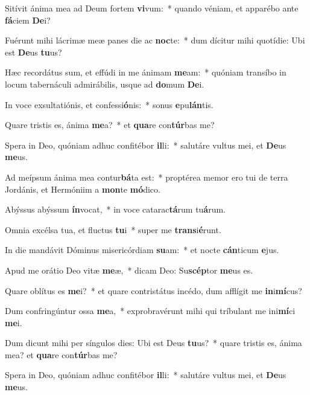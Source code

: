 \item Sitívit ánima mea ad Deum fortem \textbf{vi}vum:~* quando véniam, et apparébo ante \textbf{fá}ciem \textbf{De}i?
\item Fuérunt mihi lácrimæ meæ panes die ac \textbf{noc}te:~* dum dícitur mihi quotídie: Ubi est \textbf{De}us \textbf{tu}us?
\item Hæc recordátus sum, et effúdi in me ánimam \textbf{me}am:~* quóniam transíbo in locum tabernáculi admirábilis, usque ad \textbf{do}mum \textbf{De}i.
\item In voce exsultatiónis, et confessi\textbf{ó}nis:~* sonus \textbf{e}pu\textbf{lán}tis.
\item Quare tristis es, ánima \textbf{me}a?~* et \textbf{qua}re con\textbf{túr}bas me?
\item Spera in Deo, quóniam adhuc confitébor \textbf{il}li:~* salutáre vultus mei, et \textbf{De}us \textbf{me}us.
\item Ad meípsum ánima mea contur\textbf{bá}ta est:~* proptérea memor ero tui de terra Jordánis, et Hermóniim a \textbf{mon}te \textbf{mó}dico.
\item Abýssus abýssum \textbf{ín}vocat,~* in voce catarac\textbf{tá}rum tu\textbf{á}rum.
\item Omnia excélsa tua, et fluctus \textbf{tu}i~* super me \textbf{trans}i\textbf{é}runt.
\item In die mandávit Dóminus misericórdiam \textbf{su}am:~* et nocte \textbf{cán}ticum \textbf{e}jus.
\item Apud me orátio Deo vitæ \textbf{me}æ,~* dicam Deo: Su\textbf{scép}tor \textbf{me}us es.
\item Quare oblítus es \textbf{me}i?~* et quare contristátus incédo, dum afflígit me \textbf{in}i\textbf{mí}cus?
\item Dum confringúntur ossa \textbf{me}a,~* exprobravérunt mihi qui tríbulant me ini\textbf{mí}ci \textbf{me}i.
\item Dum dicunt mihi per síngulos dies: Ubi est Deus \textbf{tu}us?~* quare tristis es, ánima mea? et \textbf{qua}re con\textbf{túr}bas me?
\item Spera in Deo, quóniam adhuc confitébor \textbf{il}li:~* salutáre vultus mei, et \textbf{De}us \textbf{me}us.
